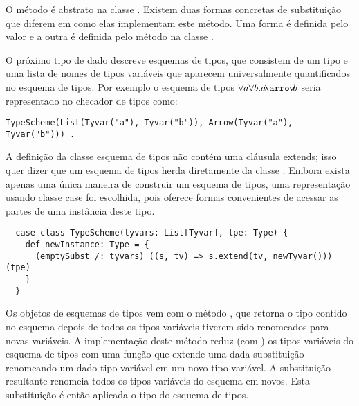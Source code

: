 O método  é abstrato na classe .  Existem duas formas concretas de substituição
que diferem em como elas implementam este método. Uma forma é definida pelo valor  e a outra
é definida pelo método  na classe .

O próximo tipo de dado descreve esquemas de tipos, que consistem de um tipo
e uma lista de nomes de tipos variáveis que aparecem universalmente quantificados
no esquema de tipos.
Por exemplo o esquema de tipos $\forall a\forall b.a \!\arrow\! b$ seria representado no checador de tipos como:
\begin{lstlisting}
TypeScheme(List(Tyvar("a"), Tyvar("b")), Arrow(Tyvar("a"), Tyvar("b"))) .
\end{lstlisting}
A definição da classe esquema de tipos não contém uma cláusula extends;
isso quer dizer que um esquema de tipos herda diretamente da classe
.  Embora exista apenas uma única maneira de construir um
esquema de tipos, uma representação usando classe case foi escolhida, pois
oferece formas convenientes de acessar as partes de uma instância deste tipo.

\begin{lstlisting}
  case class TypeScheme(tyvars: List[Tyvar], tpe: Type) {
    def newInstance: Type = {
      (emptySubst /: tyvars) ((s, tv) => s.extend(tv, newTyvar())) (tpe)
    }
  }
\end{lstlisting}

Os objetos de esquemas de tipos vem com o método , que retorna o
tipo contido no esquema depois de todos os tipos variáveis tiverem sido renomeados
para novas variáveis. A implementação deste método reduz (com \code{/:}) 
os tipos variáveis do esquema de tipos  com uma função que extende uma dada substituição 
 renomeando um dado tipo variável  em um novo tipo variável.
A substituição resultante renomeia todos os tipos variáveis do esquema em novos.
Esta substituição é então aplicada o tipo do esquema de tipos.

